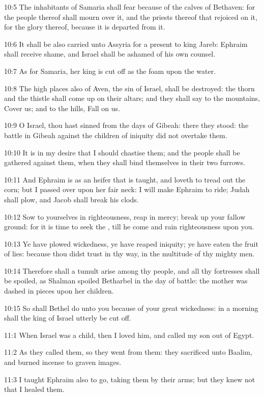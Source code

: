 10:5 The inhabitants of Samaria shall fear because of the calves of Bethaven: for the people thereof shall mourn over it, and the priests thereof that rejoiced on it, for the glory thereof, because it is departed from it.

10:6 It shall be also carried unto Assyria for a present to king Jareb: Ephraim shall receive shame, and Israel shall be ashamed of his own counsel.

10:7 As for Samaria, her king is cut off as the foam upon the water.

10:8 The high places also of Aven, the sin of Israel, shall be destroyed: the thorn and the thistle shall come up on their altars; and they shall say to the mountains, Cover us; and to the hills, Fall on us.

10:9 O Israel, thou hast sinned from the days of Gibeah: there they stood: the battle in Gibeah against the children of iniquity did not overtake them.

10:10 It is in my desire that I should chastise them; and the people shall be gathered against them, when they shall bind themselves in their two furrows.

10:11 And Ephraim is as an heifer that is taught, and loveth to tread out the corn; but I passed over upon her fair neck: I will make Ephraim to ride; Judah shall plow, and Jacob shall break his clods.

10:12 Sow to yourselves in righteousness, reap in mercy; break up your fallow ground: for it is time to seek the \LORD, till he come and rain righteousness upon you.

10:13 Ye have plowed wickedness, ye have reaped iniquity; ye have eaten the fruit of lies: because thou didst trust in thy way, in the multitude of thy mighty men.

10:14 Therefore shall a tumult arise among thy people, and all thy fortresses shall be spoiled, as Shalman spoiled Betharbel in the day of battle: the mother was dashed in pieces upon her children.

10:15 So shall Bethel do unto you because of your great wickedness: in a morning shall the king of Israel utterly be cut off.

11:1 When Israel was a child, then I loved him, and called my son out of Egypt.

11:2 As they called them, so they went from them: they sacrificed unto Baalim, and burned incense to graven images.

11:3 I taught Ephraim also to go, taking them by their arms; but they knew not that I healed them.


